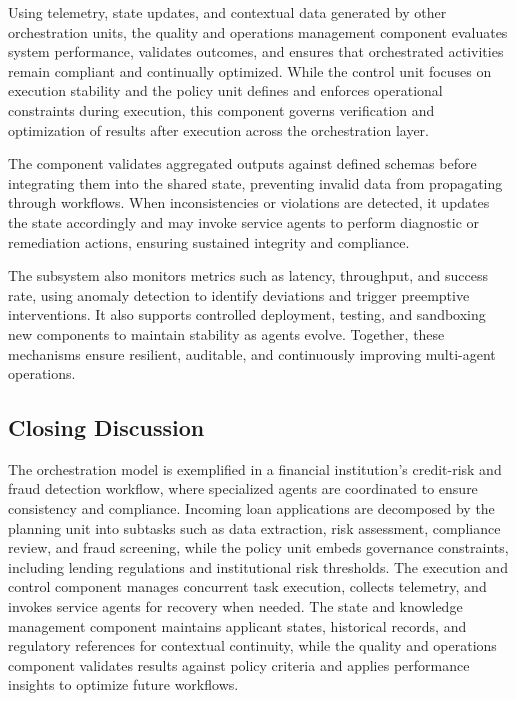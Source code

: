 \documentclass[conference]{IEEEtran}
\begin{document}
Using telemetry, state updates, and contextual data generated by other orchestration units, the quality and operations management component evaluates system performance, validates outcomes, and ensures that orchestrated activities remain compliant and continually optimized. While the control unit focuses on execution stability and the policy unit defines and enforces operational constraints during execution, this component governs verification and optimization of results after execution across the orchestration layer.  

The component validates aggregated outputs against defined schemas before integrating them into the shared state, preventing invalid data from propagating through workflows. When inconsistencies or violations are detected, it updates the state accordingly and may invoke service agents to perform diagnostic or remediation actions, ensuring sustained integrity and compliance. 

The subsystem also monitors metrics such as latency, throughput, and success rate, using anomaly detection to identify deviations and trigger preemptive interventions. It also supports controlled deployment, testing, and sandboxing new components to maintain stability as agents evolve. Together, these mechanisms ensure resilient, auditable, and continuously improving multi-agent operations. 

\subsection{Closing Discussion}

The orchestration model is exemplified in a financial institution’s credit-risk and fraud detection workflow, where specialized agents are coordinated to ensure consistency and compliance.  Incoming loan applications are decomposed by the planning unit into subtasks such as data extraction, risk assessment, compliance review, and fraud screening, while the policy unit embeds governance constraints, including lending regulations and institutional risk thresholds. The execution and control component manages concurrent task execution, collects telemetry, and invokes service agents for recovery when needed. The state and knowledge management component maintains applicant states, historical records, and regulatory references for contextual continuity, while the quality and operations component validates results against policy criteria and applies performance insights to optimize future workflows. 
\end{document}
